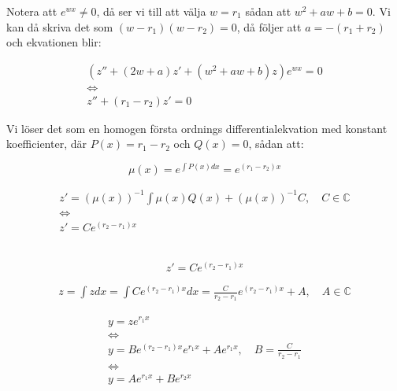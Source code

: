 \documentclass{article}
\begin{document}
\noindent Notera att $e^{wx} \neq 0$, då ser vi till att välja $w=r_1$ sådan att $w^2+aw+b=0$. Vi kan då skriva det som $(w-r_1)(w-r_2)=0$, då följer att $a=-(r_1+r_2)$ och ekvationen blir:

\begin{equation}
\begin{gathered}
    (z''+(2w+a)z'+(w^2+aw+b)z)e^{wx} = 0\\
    \Leftrightarrow\\
    z''+(r_1-r_2)z'=0
\end{gathered}
\end{equation}

\noindent Vi löser det som en homogen första ordnings differentialekvation med konstant koefficienter, där $P(x)=r_1-r_2$ och $Q(x)=0$, sådan att:

\begin{equation}
    \mu(x) = e^{\int P(x)dx} = e^{(r_1-r_2)x} 
\end{equation}

\begin{equation}
\begin{gathered}
    z' = (\mu(x))^{-1}\int \mu(x)Q(x) + (\mu(x))^{-1}C,
    \quad C \in \mathbb{C}\\
    \Leftrightarrow\\
    z' = Ce^{(r_2-r_1)x}\\
\end{gathered}
\end{equation}

\subsection*{}

\begin{equation}
    z' = Ce^{(r_2-r_1)x}
\end{equation}

\begin{equation}
\begin{gathered}
    z = \int zdx = \int Ce^{(r_2-r_1)x}dx
    = 
    \frac{C}{r_2-r_1}e^{(r_2-r_1)x} + A,
    \quad A \in \mathbb{C}
\end{gathered}
\end{equation}

\begin{equation}
\begin{gathered}
    y = ze^{r_1x}\\
    \Leftrightarrow\\
    y = Be^{(r_2-r_1)x}e^{r_1x} + Ae^{r_1x},\quad B = \frac{C}{r_2-r_1}\\
    \Leftrightarrow\\
    y = Ae^{r_1x} + Be^{r_2x}
\end{gathered}
\end{equation}
\end{document}
